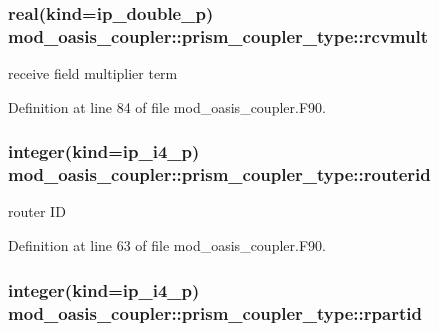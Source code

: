 \hypertarget{structmod__oasis__coupler_1_1prism__coupler__type_a9733b71cc0ade029f7f19be6ad114596}{
\subsubsection[{rcvmult}]{\setlength{\rightskip}{0pt plus 5cm}real(kind=ip\+\_\+double\+\_\+p) mod\+\_\+oasis\+\_\+coupler\+::prism\+\_\+coupler\+\_\+type\+::rcvmult\hspace{0.3cm}{\ttfamily [private]}}}\label{structmod__oasis__coupler_1_1prism__coupler__type_a9733b71cc0ade029f7f19be6ad114596}


receive field multiplier term 



Definition at line 84 of file mod\+\_\+oasis\+\_\+coupler.\+F90.

\hypertarget{structmod__oasis__coupler_1_1prism__coupler__type_ab6ce21d836e3fc511fcb028f99b0abd7}{
\subsubsection[{routerid}]{\setlength{\rightskip}{0pt plus 5cm}integer(kind=ip\+\_\+i4\+\_\+p) mod\+\_\+oasis\+\_\+coupler\+::prism\+\_\+coupler\+\_\+type\+::routerid\hspace{0.3cm}{\ttfamily [private]}}}\label{structmod__oasis__coupler_1_1prism__coupler__type_ab6ce21d836e3fc511fcb028f99b0abd7}


router I\+D 



Definition at line 63 of file mod\+\_\+oasis\+\_\+coupler.\+F90.

\hypertarget{structmod__oasis__coupler_1_1prism__coupler__type_a1bf4a986a745318b93d46612b95b0489}{
\subsubsection[{rpartid}]{\setlength{\rightskip}{0pt plus 5cm}integer(kind=ip\+\_\+i4\+\_\+p) mod\+\_\+oasis\+\_\+coupler\+::prism\+\_\+coupler\+\_\+type\+::rpartid\hspace{0.3cm}{\ttfamily [private]}}}\label{structmod__oasis__coupler_1_1prism__coupler__type_a1bf4a986a745318b93d46612b95b0489}


